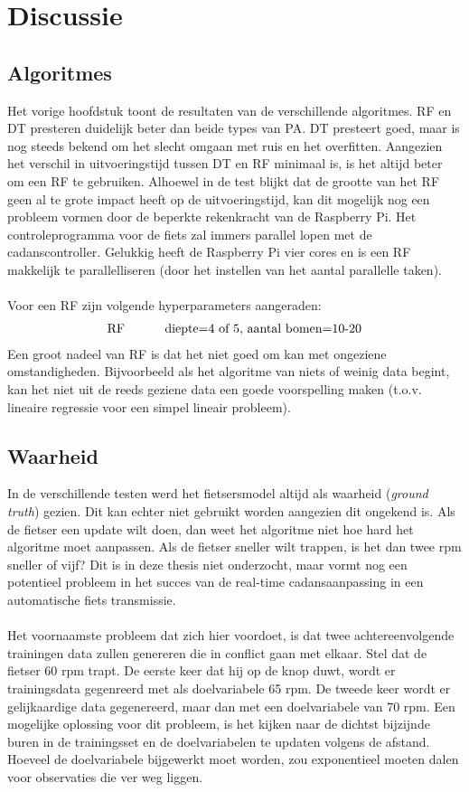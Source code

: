\chapter{Discussie}
\section{Algoritmes}
Het vorige hoofdstuk toont de resultaten van de verschillende algoritmes. RF en DT presteren duidelijk beter dan beide types van PA. DT presteert goed, maar is nog steeds bekend om het slecht omgaan met ruis en het overfitten. Aangezien het verschil in uitvoeringstijd tussen DT en RF minimaal is, is het altijd beter om een RF te gebruiken. Alhoewel in de test blijkt dat de grootte van het RF geen al te grote impact heeft op de uitvoeringstijd, kan dit mogelijk nog een probleem vormen door de beperkte rekenkracht van de Raspberry Pi. Het controleprogramma voor de fiets zal immers parallel lopen met de cadanscontroller. Gelukkig heeft de Raspberry Pi vier cores en is een RF makkelijk te parallelliseren (door het instellen van het aantal parallelle taken).
\\\\
Voor een RF zijn volgende hyperparameters aangeraden:
\begin{gather*}
\text{RF \tab diepte=4 of 5, aantal bomen=10-20}
\end{gather*}
Een groot nadeel van RF is dat het niet goed om kan met ongeziene omstandigheden. Bijvoorbeeld als het algoritme van niets of weinig data begint, kan het niet uit de reeds geziene data een goede voorspelling maken (t.o.v. lineaire regressie voor een simpel lineair probleem).
\section{Waarheid}
In de verschillende testen werd het fietsersmodel altijd als waarheid (\textit{ground truth}) gezien. Dit kan echter niet gebruikt worden aangezien dit ongekend is. Als de fietser een update wilt doen, dan weet het algoritme niet hoe hard het algoritme moet aanpassen. Als de fietser sneller wilt trappen, is het dan twee rpm sneller of vijf? Dit is in deze thesis niet onderzocht, maar vormt nog een potentieel probleem in het succes van de real-time cadansaanpassing in een automatische fiets transmissie.
\\\\
Het voornaamste probleem dat zich hier voordoet, is dat twee achtereenvolgende trainingen data zullen genereren die in conflict gaan met elkaar. Stel dat de fietser 60 rpm trapt. De eerste keer dat hij op de knop duwt, wordt er trainingsdata gegenreerd met als doelvariabele 65 rpm. De tweede keer wordt er gelijkaardige data gegenereerd, maar dan met een doelvariabele van 70 rpm. Een mogelijke oplossing voor dit probleem, is het kijken naar de dichtst bijzijnde buren in de trainingsset en de doelvariabelen te updaten volgens de afstand. Hoeveel de doelvariabele bijgewerkt moet worden, zou exponentieel moeten dalen voor observaties die ver weg liggen.
